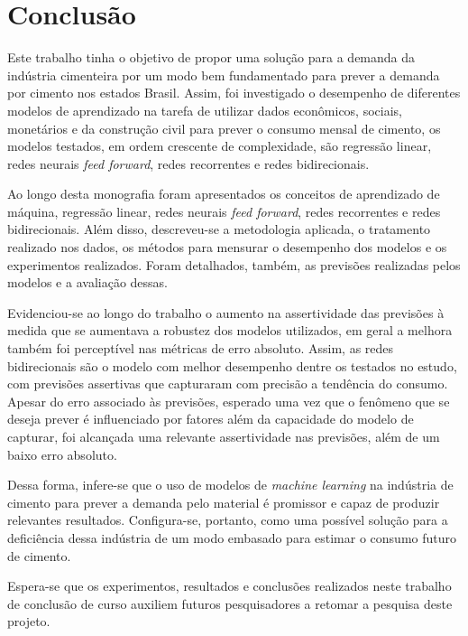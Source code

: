 
\chapter{Conclusão}
\label{chap:conclusao}

Este trabalho tinha o objetivo de propor uma solução para a demanda da indústria cimenteira 
por um modo bem fundamentado para prever a demanda por cimento nos estados Brasil.
Assim, foi investigado o desempenho de diferentes modelos de aprendizado na 
tarefa de utilizar dados econômicos, sociais, monetários e da construção civil 
para prever o consumo mensal de cimento, os modelos testados, em ordem 
crescente de complexidade, são regressão linear, redes neurais \textit{feed 
forward}, redes recorrentes e redes bidirecionais. 

Ao longo desta monografia foram apresentados os conceitos de aprendizado 
de máquina, regressão linear, redes neurais \textit{feed forward}, redes 
recorrentes e redes bidirecionais. Além disso, descreveu-se a metodologia aplicada, 
o tratamento realizado nos dados, os métodos para mensurar o desempenho dos 
modelos e os experimentos realizados. Foram detalhados, também, as previsões
realizadas pelos modelos e a avaliação dessas.

Evidenciou-se ao longo do trabalho o aumento na assertividade das previsões 
à medida que se aumentava a robustez dos modelos utilizados, em geral a melhora
também foi perceptível nas métricas de erro absoluto. Assim, as redes bidirecionais
são o modelo com melhor desempenho dentre os testados no estudo, com previsões
assertivas que capturaram com precisão a tendência do consumo. Apesar do erro 
associado às previsões, esperado uma vez que o fenômeno que se deseja prever 
é influenciado por fatores além da capacidade do modelo de capturar, foi 
alcançada uma relevante assertividade nas previsões, além de um baixo erro 
absoluto.

Dessa forma, infere-se que o uso de modelos de \textit{machine learning} na indústria 
de cimento para prever a demanda pelo material é promissor e capaz de produzir 
relevantes resultados. Configura-se, portanto, como uma possível solução para 
a deficiência dessa indústria de um modo embasado para estimar o consumo futuro de 
cimento. 

Espera-se que os experimentos, resultados e conclusões realizados 
neste trabalho de conclusão de curso auxiliem futuros pesquisadores a retomar a 
pesquisa deste projeto.
